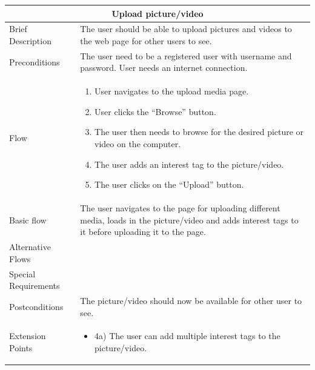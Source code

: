 \begin{minipage}{\linewidth}
\begin{tabular}{|l|p{85mm}|}
  \hline
  \multicolumn{2}{|c|}{\cellcolor{gray!25} \textbf{Upload picture/video}} \\
  \hline
  Brief Description & The user should be able to upload pictures and videos to the web page for other users to see.\\
  Preconditions & The user need to be a registered user with username and password. User needs an internet connection.\\
  Flow &
    \begin{enumerate}
      \item User navigates to the upload media page.
      \item User clicks the “Browse” button.
      \item The user then needs to browse for the desired picture or video on the computer.
      \item The user adds an interest tag to the picture/video.
      \item The user clicks on the “Upload” button.
    \end{enumerate} \\
  Basic flow & The user navigates to the page for uploading different media, loads in the picture/video and adds interest tags to it before uploading it to the page.\\
  Alternative Flows & \\
  Special Requirements & \\
  Postconditions & The picture/video should now be available for other user to see. \\
  Extension Points & 
    \begin{itemize}
      \item 4a) The user can add multiple interest tags to the picture/video.
    \end{itemize} \\
  \hline
\end{tabular}
\end{minipage}

